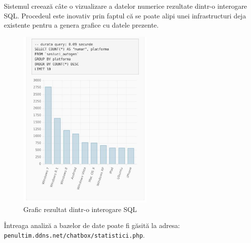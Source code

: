 \documentclass[12pt,a4paper]{article}
\begin{document}
Sistemul creează câte o vizualizare a datelor numerice rezultate dintr-o interogare SQL. Procedeul este inovativ prin faptul că se poate alipi unei infrastructuri deja existente pentru a genera grafice cu datele prezente. \\[0.34cm]


\begin{figure}[!h]
	\centering
	\vspace{-7px}
	\includegraphics[width=0.60\textwidth]{img/stat.jpg}
	\vspace{-7px}
	\caption{Grafic rezultat dintr-o interogare SQL}
\end{figure}

Întreaga analiză a bazelor de date poate fi găsită la adresa:\\
\texttt{penultim.ddns.net/chatbox/statistici.php}.

\newpage
\end{document}
